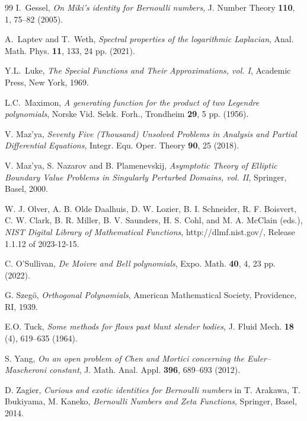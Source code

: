 \documentclass[letterpaper,10pt]{amsart}
\numberwithin{equation}{section}
\begin{document}
\begin{thebibliography}{99}
 I.\ Gessel, \textit{On Miki's identity for Bernoulli numbers}, J. Number Theory {\bf 110}, 1, 75--82 (2005).

 A.\ Laptev and T.\ Weth, \textit{Spectral properties of the logarithmic Laplacian}, Anal. Math. Phys. {\bf 11}, 133, 24 pp. (2021).

 Y.L.\ Luke, \textit{The Special Functions and Their Approximations, vol. I}, Academic Press, New York, 1969.

 L.C.\ Maximon, \textit{A generating function for the product of two Legendre polynomials}, Norske Vid. Selsk. Forh., Trondheim \textbf{29}, 5 pp. (1956).

 V. Maz'ya, \textit{Seventy Five (Thousand) Unsolved Problems in Analysis and Partial Differential Equations}, Integr. Equ. Oper. Theory \textbf{90}, 25 (2018).

 V. Maz'ya, S. Nazarov and B. Plamenevskij, \textit{Asymptotic Theory of Elliptic Boundary Value Problems in Singularly Perturbed Domains, vol. II}, Springer, Basel, 2000.

 W. J. Olver, A. B. Olde Daalhuis, D. W. Lozier, B. I. Schneider, R. F. Boisvert, C. W. Clark, B. R. Miller, B. V. Saunders, H. S. Cohl, and M. A. McClain (eds.), {\it NIST Digital Library of Mathematical Functions}, http://dlmf.nist.gov/, Release 1.1.12 of 2023-12-15.

 C. O'Sullivan, \textit{De Moivre and Bell polynomials}, Expo. Math. \textbf{40}, 4, 23 pp. (2022).

 G. Szegö, \textit{Orthogonal Polynomials}, American Mathematical Society, Providence, RI, 1939.

 E.O. Tuck, \textit{Some methods for flows past blunt slender bodies}, J. Fluid Mech. \textbf{18} (4), 619--635 (1964).

 S. Yang, \textit{On an open problem of Chen and Mortici concerning the
Euler–Mascheroni constant}, J. Math. Anal. Appl. \textbf{396}, 689--693 (2012). 

 D. Zagier, \textit{Curious and exotic identities for Bernoulli
numbers} in T. Arakawa, T. Ibukiyama, M. Kaneko, \textit{Bernoulli Numbers and Zeta Functions}, Springer, Basel, 2014.
\end{thebibliography}
\end{document}
